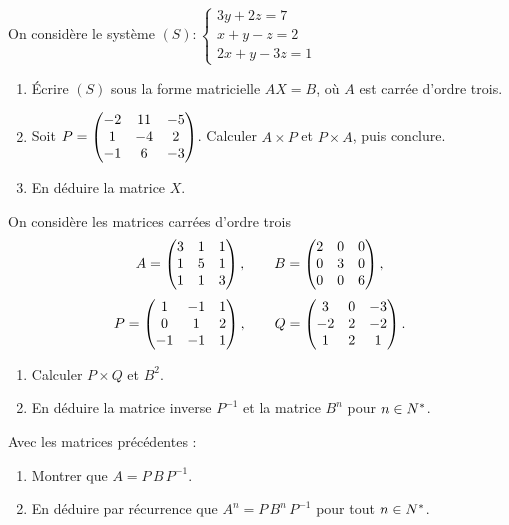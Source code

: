 \begin{annales}
On considère le système
$(S) : \begin{cases} 3y+2z = 7 \\ x+y-z = 2 \\ 2x+y-3z = 1 \end{cases}$
\begin{enumerate}[label=\textbf{\arabic*)}, leftmargin=*, itemsep=0.15em]
  \item Écrire $(S)$ sous la forme matricielle $AX = B$, où $A$ est carrée
        d'ordre trois.
  \item Soit $P = \begin{pmatrix} -2 & 11 & -5 \\ 1 & -4 & 2 \\ -1 & 6 & -3 \end{pmatrix}$. Calculer
        $A \times P$ et $P \times A$, puis conclure.
  \item En déduire la matrice $X$.
\end{enumerate}

On considère les matrices carrées d'ordre trois
\[
  A = \begin{pmatrix} 3 & 1 & 1 \\ 1 & 5 & 1 \\ 1 & 1 & 3 \end{pmatrix}, \qquad
  B = \begin{pmatrix} 2 & 0 & 0 \\ 0 & 3 & 0 \\ 0 & 0 & 6 \end{pmatrix},
\]
\[
  P = \begin{pmatrix} 1 & -1 & 1 \\ 0 & 1 & 2 \\ -1 & -1 & 1 \end{pmatrix}, \qquad
  Q = \begin{pmatrix} 3 & 0 & -3 \\ -2 & 2 & -2 \\ 1 & 2 & 1 \end{pmatrix}.
\]
\begin{enumerate}[label=\textbf{\alph*)}, leftmargin=*, itemsep=0.15em]
  \item Calculer $P \times Q$ et $B^{2}$.
  \item En déduire la matrice inverse $P^{-1}$ et la matrice $B^{n}$ pour
        $n \in N^{*}$.
\end{enumerate}

Avec les matrices précédentes :
\begin{enumerate}[label=\textbf{\alph*)}, leftmargin=*, itemsep=0.15em]
  \item Montrer que $A = P\,B\,P^{-1}$.
  \item En déduire par récurrence que $A^{n} = P\,B^{n}\,P^{-1}$ pour tout
        $n \in N^{*}$.
\end{enumerate}
\end{annales}


